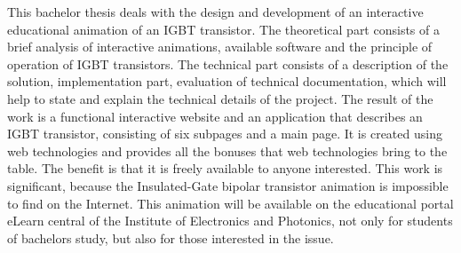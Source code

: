 This bachelor thesis deals with the design and development of an interactive educational animation of an \acrshort{IGBT} transistor. The theoretical part consists of a brief analysis of interactive animations, available software and the principle of operation of \acrshort{IGBT} transistors. The technical part consists of a description of the solution, implementation part, evaluation of technical documentation, which will help to state and explain the technical details of the project. The result of the work is a functional interactive website and an application that describes an \acrshort{IGBT} transistor, consisting of six subpages and a main page. It is created using web technologies and provides all the bonuses that web technologies bring to the table. The benefit is that it is freely available to anyone interested. This work is significant, because the Insulated-Gate bipolar transistor animation is impossible to find on the Internet. This animation will be available on the educational portal eLearn central of the Institute of Electronics and Photonics, not only for students of bachelors study, but also for those interested in the issue.